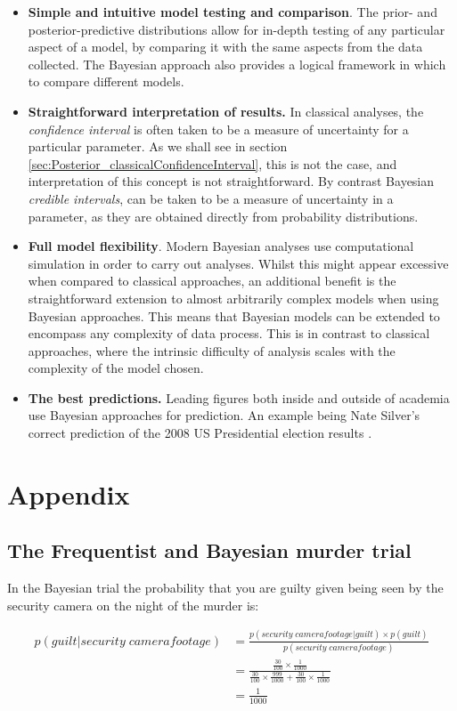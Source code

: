 \documentclass[11pt,fullpage]{book}
\begin{document}
\begin{itemize}
\item \textbf{Simple and intuitive model testing and comparison}. The prior- and posterior-predictive distributions allow for in-depth testing of any particular aspect of a model, by comparing it with the same aspects from the data collected. The Bayesian approach also provides a logical framework in which to compare different models.
\item \textbf{Straightforward interpretation of results.} In classical analyses, the \textit{confidence interval} is often taken to be a measure of uncertainty for a particular parameter. As we shall see in section \ref{sec:Posterior_classicalConfidenceInterval}, this is not the case, and interpretation of this concept is not straightforward. By contrast Bayesian \textit{credible intervals}, can be taken to be a measure of uncertainty in a parameter, as they are obtained directly from probability distributions.
\item \textbf{Full model flexibility}. Modern Bayesian analyses use computational simulation in order to carry out analyses. Whilst this might appear excessive when compared to classical approaches, an additional benefit is the straightforward extension to almost arbitrarily complex models when using Bayesian approaches. This means that Bayesian models can be extended to encompass any complexity of data process. This is in contrast to classical approaches, where the intrinsic difficulty of analysis scales with the complexity of the model chosen.
\item \textbf{The best predictions.} Leading figures both inside and outside of academia use Bayesian approaches for prediction. An example being Nate Silver's correct prediction of the 2008 US Presidential election results \cite{silver2012signal}.
\end{itemize}

\section{Appendix}
\subsection{The Frequentist and Bayesian murder trial}\label{sec:Intro_appendixMurder}
In the Bayesian trial the probability that you are guilty given being seen by the security camera on the night of the murder is:

\begin{equation}\label{eq:Intro_murder}
\begin{align}
p(guilt|security\; camera footage) &= \frac{p(security\; camera footage|guilt)\times p(guilt)}{p(security\; camera footage)}\\
&= \frac{\frac{30}{100}\times \frac{1}{1000}}{\frac{30}{100}\times \frac{999}{1000}+\frac{30}{100}\times \frac{1}{1000}}\\
&= \frac{1}{1000}
\end{align}
\end{equation}
\end{document}
